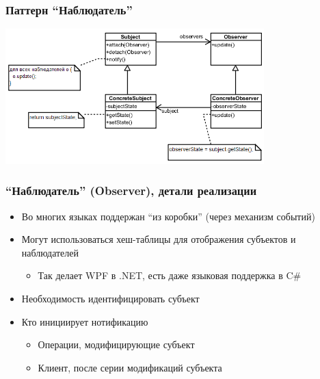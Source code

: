 \documentclass[xetex,mathserif,serif]{beamer}
\begin{document}
	\begin{frame}
		\frametitle{Паттерн ``Наблюдатель''}
		\begin{center}
			\includegraphics[width=0.75\textwidth]{observer.png}
		\end{center}
	\end{frame}

	\begin{frame}
		\frametitle{``Наблюдатель'' (Observer), детали реализации}
		\begin{itemize}
			\item Во многих языках поддержан ``из коробки'' (через механизм событий)
			\item Могут использоваться хеш-таблицы для отображения субъектов и наблюдателей
			\begin{itemize}
				\item Так делает WPF в .NET, есть даже языковая поддержка в C\#
			\end{itemize}
			\item Необходимость идентифицировать субъект
			\item Кто инициирует нотификацию
			\begin{itemize}
				\item Операции, модифицирующие субъект
				\item Клиент, после серии модификаций субъекта
			\end{itemize}
		\end{itemize}
	\end{frame}
\end{document}
